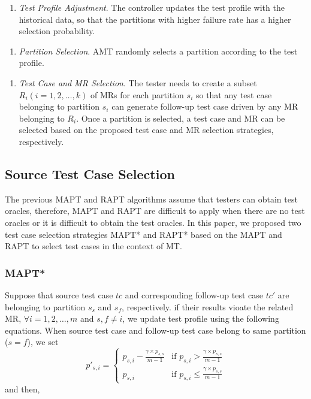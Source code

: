\documentclass[10pt,journal,compsoc]{IEEEtran}
\begin{document}
\begin{enumerate}[4]
  \item
  \emph{Test Profile Adjustment}. The controller updates the test profile with the historical data, so that the partitions with higher failure rate has a higher selection probability.
\end{enumerate}
\begin{enumerate}[5]
  \item
  \emph{Partition Selection}. AMT randomly selects a partition according to the test profile.
\end{enumerate}
\begin{enumerate}[6]
  \item
  \emph{Test Case and MR Selection}.  The tester needs to create a subset $R_i (i = 1,2,\ldots,k)$ of MRs for each
  partition $s_i$ so that any test case belonging to partition $s_i$ can generate follow-up test case driven by any MR belonging to $R_i$. Once a partition is selected, a test case and MR can be selected based on the proposed test case and MR selection strategies, respectively.
\end{enumerate}

\subsection{Source Test Case Selection}
\label{sec:stcs}

The previous MAPT and RAPT algorithms assume that testers can obtain test oracles, therefore, MAPT and RAPT are difficult to apply when there are no test oracles or it is difficult to obtain the test oracles. In this paper, we proposed two test case selection strategies MAPT* and RAPT* based on the MAPT and RAPT to select test cases in the context of MT.

\subsubsection{MAPT*}
\label{sec:mapt*}
Suppose that source test case $tc$ and corresponding follow-up test case $tc'$ are belonging to partition $s_{s}$ and $s_f$, respectively. if their results vioate the related MR, $\forall i = 1, 2, \ldots, m$ and $s, f \ne i$, we update test profile using the following equations. When source test case and follow-up test case belong to same partition ($s = f$), we set
\begin{equation}
\label{eq:MAPTKillOneSameI}
p'_{s, i} =
\begin{cases}
p_{s, i} - \displaystyle\frac{\gamma \times p_{s, s}}{m - 1}  & \text{if } p_{s, i} > \displaystyle\frac{\gamma \times p_{s, s}}{m - 1}\\
p_{s, i}                                                      & \text{if } p_{s, i} \leq \displaystyle\frac{\gamma \times p_{s, s}}{m - 1}
\end{cases}
\end{equation}
and then,
\end{document}
